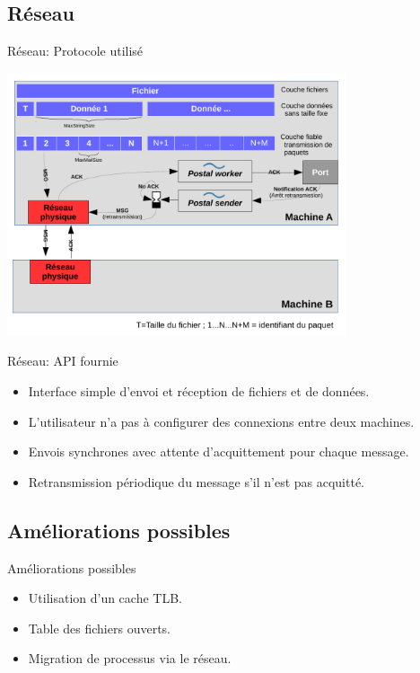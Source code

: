 \documentclass{beamer}
\begin{document}
\subsection{Réseau}

\begin{frame}{Réseau: Protocole utilisé}
        \begin{center}
			\includegraphics[width=10cm]{schema_reseau.pdf}
		\end{center}
\end{frame}

\begin{frame}{Réseau: API fournie}
	\begin{itemize}
        \item Interface simple d'envoi et réception de fichiers et de données.
        \item L'utilisateur n'a pas à configurer des connexions entre deux machines.
        \item Envois synchrones avec attente d'acquittement pour chaque message.
        \item Retransmission périodique du message s'il n'est pas acquitté.
    \end{itemize}
    
\end{frame}

\subsection{Améliorations possibles}
\begin{frame}{Améliorations possibles}
    \begin{itemize}
        \item Utilisation d'un cache TLB.
        \item Table des fichiers ouverts.
        \item Migration de processus via le réseau.
    \end{itemize}
\end{frame}
\end{document}
